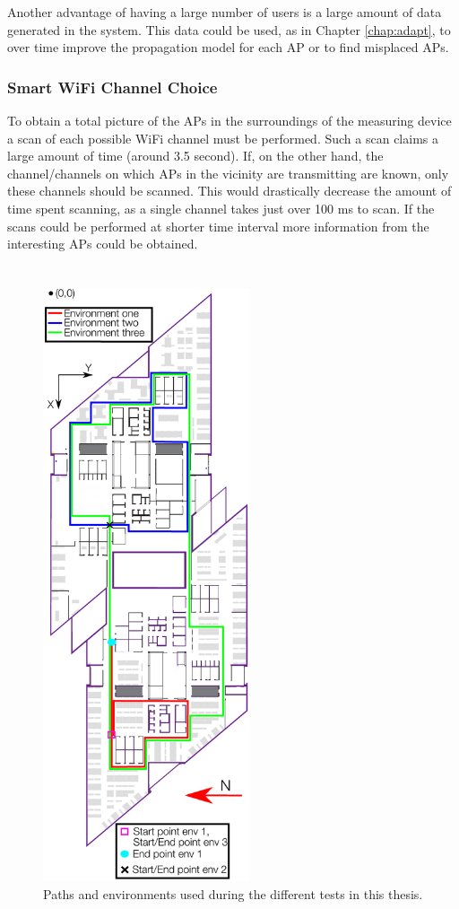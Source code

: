 \documentclass{LTHthesis}
\begin{document}
Another advantage of having a large number of users is a large amount of data generated in the system. This data could be used, as in Chapter \ref{chap:adapt}, to over time improve the propagation model for each AP or to find misplaced APs.     
%
\subsection{Smart WiFi Channel Choice}
%
To obtain a total picture of the APs in the surroundings of the measuring device a scan of each possible WiFi channel must be performed. Such a scan claims a large amount of time (around 3.5 second). If, on the other hand, the channel/channels on which APs in the vicinity are transmitting are known, only these channels should be scanned. This would drastically decrease the amount of time spent scanning, as a single channel takes just over 100 ms to scan. If the scans could be performed at shorter time interval more information from the interesting APs could be obtained.   
%
\printbibliography  %

\appendix
{}
\newpage

\begin{figure}
\begin{minipage}{\textwidth}
\chapter{}
\vspace{-110pt}
\centering
\includegraphics[height = 17.5cm]{images/map_appendix/environment_map}
\caption{Paths and environments used during the different tests in this thesis.}
\end{minipage}
\end{figure}
\end{document}
